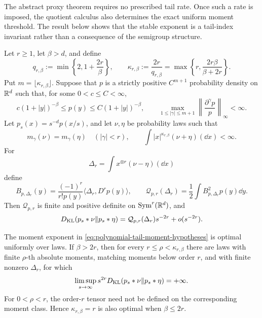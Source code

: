 The abstract proxy theorem requires no prescribed tail rate.  Once such a
rate is imposed, the quotient calculus also determines the exact uniform
moment threshold.  The result below shows that the stable exponent is a
tail-index invariant rather than a consequence of the semigroup structure.

\begin{theorem}
\label{thm:polynomial-tail-optimal-moment-exponent}
Let \(r\ge1\), let \(\beta>d\), and define
\begin{equation}\label{eq:polynomial-tail-critical-exponents}
 q_{r,\beta}:=\min\left\{2,1+\frac{2r}{\beta}\right\},
 \qquad
 \kappa_{r,\beta}:=\frac{2r}{q_{r,\beta}}
 =\max\left\{r,\frac{2r\beta}{\beta+2r}\right\}.
\end{equation}
Put \(m=\lfloor\kappa_{r,\beta}\rfloor\).  Suppose that \(p\) is a
strictly positive \(C^{m+1}\) probability density on \(\mathbb{R}^d\) such that,
for some \(0<c\le C<\infty\),
\begin{equation}\label{eq:polynomial-tail-kernel-hypotheses}
 c(1+|y|)^{-\beta}\le p(y)\le C(1+|y|)^{-\beta},
 \qquad
 \max_{1\le|\gamma|\le m+1}
 \left\|\frac{\partial^\gamma p}{p}\right\|_\infty<\infty.
\end{equation}
Let \(p_s(x)=s^{-d}p(x/s)\), and let \(\nu,\eta\) be probability laws
such that
\begin{equation}\label{eq:polynomial-tail-moment-hypotheses}
 m_\gamma(\nu)=m_\gamma(\eta)\quad(|\gamma|<r),
 \qquad
 \int |x|^{\kappa_{r,\beta}}(\nu+\eta)(\dd x)<\infty.
\end{equation}
For
\[
 \Delta_r=\int x^{\otimes r}(\nu-\eta)(\dd x)
\]
define
\begin{equation}\label{eq:polynomial-tail-leading-functional}
 B_{p,\Delta_r}(y)
 =\frac{(-1)^r}{r!p(y)}\langle\Delta_r,D^rp(y)\rangle,
 \qquad
 \mathcal Q_{p,r}(\Delta_r)
 =\frac12\int B_{p,\Delta_r}^2p(y)\dd y.
\end{equation}
Then \(\mathcal Q_{p,r}\) is finite and positive definite on
\(\operatorname{Sym}^r(\mathbb{R}^d)\), and
\begin{equation}\label{eq:polynomial-tail-first-unmatched-asymptotic}
 D_{\rm KL}(p_s*\nu\|p_s*\eta)
 =\mathcal Q_{p,r}(\Delta_r)s^{-2r}+o(s^{-2r}).
\end{equation}

The moment exponent in \eqref{eq:polynomial-tail-moment-hypotheses} is
optimal uniformly over laws.  If \(\beta>2r\), then for every
\(r\le\rho<\kappa_{r,\beta}\) there are laws with finite \(\rho\)-th
absolute moments, matching moments below order \(r\), and with finite
nonzero \(\Delta_r\), for which
\begin{equation}\label{eq:polynomial-tail-uniform-sharpness}
 \limsup_{s\to\infty}s^{2r}D_{\rm KL}(p_s*\nu\|p_s*\eta)=+\infty.
\end{equation}
For \(0<\rho<r\), the order-\(r\) tensor need not be defined on the
corresponding moment class.  Hence \(\kappa_{r,\beta}=r\) is also optimal
when \(\beta\le2r\).


\end{theorem}
